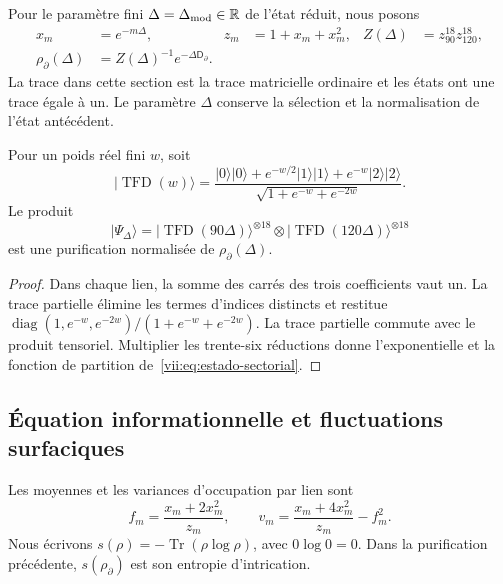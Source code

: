 Pour le paramètre fini \(\Delta=\Delta_{\rm mod}\in\mathbb R\) de l'état réduit, nous posons
\begin{align}
 x_m&=e^{-m\Delta},& z_m&=1+x_m+x_m^2,&
 Z(\Delta)&=z_{90}^{18}z_{120}^{18},\\
 \rho_\partial(\Delta)&=Z(\Delta)^{-1}e^{-\Delta\mathsf D_\partial}.
 \label{vii:eq:estado-sectorial}
\end{align}
La trace dans cette section est la trace matricielle ordinaire et les états ont une trace égale à un. Le paramètre \(\Delta\) conserve la sélection et la normalisation de l'état antécédent.

\begin{proposition}
\label{vii:prop:purificacion-sectorial}
Pour un poids réel fini \(w\), soit
\begin{equation}
 |\operatorname{TFD}(w)\rangle
 =\frac{|0\rangle|0\rangle+e^{-w/2}|1\rangle|1\rangle
                   +e^{-w}|2\rangle|2\rangle}
        {\sqrt{1+e^{-w}+e^{-2w}}}.
 \label{vii:eq:tfd-local}
\end{equation}
Le produit
\begin{equation}
 |\Psi_\Delta\rangle
 =|\operatorname{TFD}(90\Delta)\rangle^{\otimes18}
  \otimes|\operatorname{TFD}(120\Delta)\rangle^{\otimes18}
 \label{vii:eq:tfd-sectorial}
\end{equation}
est une purification normalisée de \(\rho_\partial(\Delta)\).
\end{proposition}
\begin{proof}
Dans chaque lien, la somme des carrés des trois coefficients vaut un.
La trace partielle élimine les termes d'indices distincts et restitue
\(\operatorname{diag}(1,e^{-w},e^{-2w})/(1+e^{-w}+e^{-2w})\).
La trace partielle commute avec le produit tensoriel. Multiplier les
trente-six réductions donne l'exponentielle et la fonction de partition
de~\eqref{vii:eq:estado-sectorial}.
\end{proof}

\subsection{Équation informationnelle et fluctuations surfaciques}
\label{vii:subsec:ecuacion-informacional}

Les moyennes et les variances d'occupation par lien sont
\begin{equation}
 f_m=\frac{x_m+2x_m^2}{z_m},\qquad
 v_m=\frac{x_m+4x_m^2}{z_m}-f_m^2.
 \label{vii:eq:momentos-sectoriales}
\end{equation}
Nous écrivons \(s(\rho)=-\operatorname{Tr}(\rho\log\rho)\), avec \(0\log0=0\). Dans la purification précédente, \(s(\rho_\partial)\) est son entropie d'intrication.

